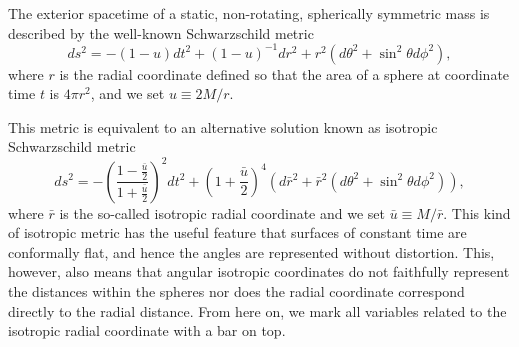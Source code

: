\documentclass{aa}
\newcommand{\be}{\begin{equation}}
\newcommand{\ee}{\end{equation}}
\newcommand{\refe}[1]{#1}
\newcommand{\refedel}[1]{}
\newcommand{\sch}{Schwarzschild }
\newcommand{\rb}{\ensuremath{\bar{r}}}
\newcommand{\ub}{\ensuremath{\bar{u}}}
\begin{document}
\refedel{The spacetime metric around a static non-rotating spherically symmetric object is given by the well known \sch solution}
\refe{ The exterior spacetime of a static, non-rotating, spherically symmetric mass is described by the well-known Schwarzschild metric}
\be
ds^2  = -(1-u) dt^2 + (1-u)^{-1}dr^2+r^2(d\theta^2+\sin^2\theta d\phi^2),
\ee
\refe{where $r$ is the radial coordinate defined so that the area of a sphere at coordinate time $t$ is $4\pi r^2$, and we set $u \equiv 2M/r$.}

This metric is equivalent to an alternative solution known as isotropic \sch metric \citep[see e.g.][]{MTW73}
\be
\label{eq:ISch}
ds^2 = -\left( \frac{1-\frac{\ub}{2}}{1+\frac{\ub}{2}} \right)^2 dt^2 + \left( 1+\frac{\ub}{2} \right)^4(d\rb^2 + \rb^2(d\theta^2+\sin^2\theta d\phi^2)),
\ee
\refe{where $\rb$ is the so-called isotropic radial coordinate and we set $\ub \equiv M/\rb$.}
This kind of isotropic metric has the useful feature that surfaces of constant time are conformally flat, and hence the angles are represented without distortion.
This, however, also means that angular isotropic coordinates do not faithfully represent the distances within the spheres nor does the radial coordinate correspond directly to the radial distance.
From here on, we mark all variables related to the isotropic radial coordinate with a bar on top.
\end{document}
